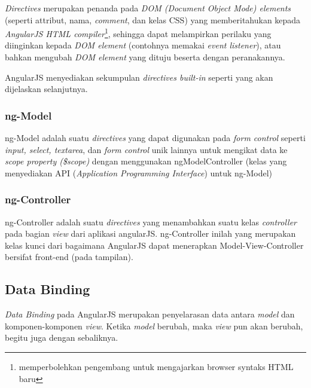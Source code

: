 	\textit{Directives} merupakan penanda pada \textit{DOM (Document Object Mode) elements} (seperti attribut, nama, \textit{comment},  dan kelas CSS) yang memberitahukan kepada \textit{AngularJS HTML compiler}\footnote{memperbolehkan pengembang untuk mengajarkan browser syntaks HTML baru}, sehingga dapat melampirkan perilaku yang diinginkan kepada \textit{DOM element} (contohnya memakai \textit{event listener}), atau bahkan mengubah \textit{DOM element} yang dituju beserta dengan peranakannya.
	
	AngularJS menyediakan sekumpulan \textit{directives built-in} seperti yang akan dijelaskan selanjutnya.
	
	\subsubsection{ng-Model}
	ng-Model adalah suatu \textit{directives} yang dapat digunakan pada \textit{form control} seperti \textit{input, select, textarea}, dan \textit{form control} unik lainnya untuk mengikat data ke \textit{scope property (\$scope)} dengan menggunakan ngModelController (kelas yang menyediakan API (\textit{Application Programming Interface}) untuk ng-Model)
	
	\subsubsection{ng-Controller}
	ng-Controller adalah suatu \textit{directives} yang menambahkan suatu kelas \textit{controller} pada bagian \textit{view} dari aplikasi angularJS. ng-Controller inilah yang merupakan kelas kunci dari bagaimana AngularJS dapat menerapkan Model-View-Controller bersifat front-end (pada tampilan).

\subsection{Data Binding}
\label{sub: dataBinding}
	
	\textit{Data Binding} pada AngularJS merupakan penyelarasan data antara \textit{model} dan komponen-komponen \textit{view}. Ketika \textit{model} berubah, maka \textit{view} pun akan berubah, begitu juga dengan sebaliknya.
	
